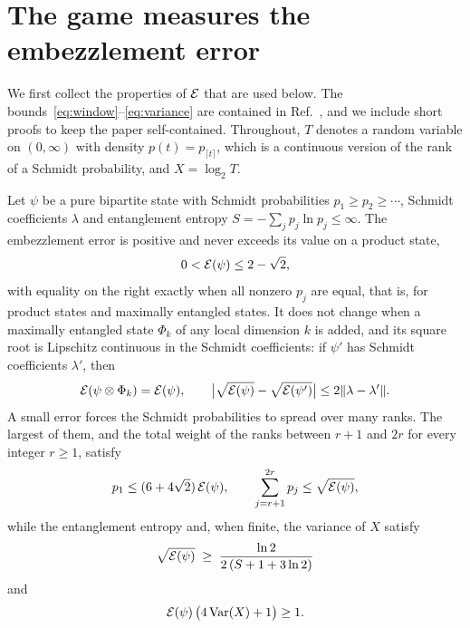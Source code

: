 \section{The game measures the embezzlement error}\label{sec:equiv}

We first collect the properties of $\cE$ that are used below. The
bounds~\eqref{eq:window}--\eqref{eq:variance} are contained in Ref.~\cite[Section~6.4]{TG}, and
we include short proofs to keep the paper self-contained. Throughout, $T$ denotes a random
variable on $(0,\infty)$ with density $p(t)=p_{\lceil t\rceil}$, which is a continuous version
of the rank of a Schmidt probability, and $X=\log_2T$.

\begin{proposition}[Properties of $\cE$]\label{prop:E}
Let $\psi$ be a pure bipartite state with Schmidt probabilities $p_1\ge p_2\ge\cdots$, Schmidt
coefficients $\lambda$ and entanglement entropy $S=-\sum_jp_j\ln p_j\le\infty$. The embezzlement
error is positive and never exceeds its value on a product state,
\begin{equation}\label{eq:range}
0<\mathcal{E}(\psi)\le2-\sqrt2,
\end{equation}
with equality on the right exactly when all nonzero $p_j$ are equal, that is, for product
states and maximally entangled states. It does not change when a maximally entangled state
$\Phi_k$ of any local dimension $k$ is added, and its square root is Lipschitz continuous in the
Schmidt coefficients: if $\psi'$ has Schmidt coefficients $\lambda'$, then
\begin{equation}\label{eq:invariance}
\mathcal{E}(\psi\otimes\Phi_k)=\mathcal{E}(\psi),\qquad
\bigl\lvert\sqrt{\mathcal{E}(\psi)}-\sqrt{\mathcal{E}(\psi')}\bigr\rvert\le2\lVert \lambda-\lambda'\rVert.
\end{equation}
A small error forces the Schmidt probabilities to spread over many ranks. The largest of them,
and the total weight of the ranks between $r+1$ and $2r$ for every integer $r\ge1$, satisfy
\begin{equation}\label{eq:window}
p_1\le(6+4\sqrt2)\,\mathcal{E}(\psi),\qquad\sum_{j=r+1}^{2r}p_j\le\sqrt{\mathcal{E}(\psi)} ,
\end{equation}
while the entanglement entropy and, when finite, the variance of $X$ satisfy
\begin{equation}\label{eq:entropybound}
\sqrt{\mathcal{E}(\psi)}\;\ge\;\frac{\ln2}{2\,(S+1+3\ln2)}
\end{equation}
and
\begin{equation}\label{eq:variance}
\mathcal{E}(\psi)\,\bigl(4\operatorname{Var}(X)+1\bigr)\ge1 .
\end{equation}
\end{proposition}

